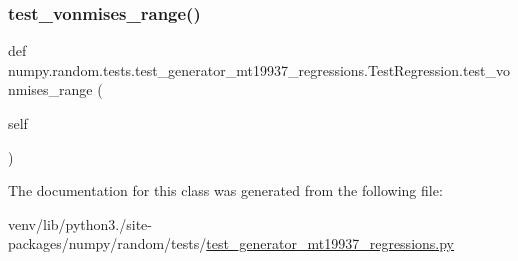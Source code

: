 \subsubsection{\texorpdfstring{test\+\_\+vonmises\+\_\+range()}{test\_vonmises\_range()}}
{\footnotesize\ttfamily def numpy.\+random.\+tests.\+test\+\_\+generator\+\_\+mt19937\+\_\+regressions.\+Test\+Regression.\+test\+\_\+vonmises\+\_\+range (\begin{DoxyParamCaption}\item[{}]{self }\end{DoxyParamCaption})}



The documentation for this class was generated from the following file\+:\begin{DoxyCompactItemize}
\item 
venv/lib/python3./site-\/packages/numpy/random/tests/\hyperlink{test__generator__mt19937__regressions_8py}{test\+\_\+generator\+\_\+mt19937\+\_\+regressions.\+py}\end{DoxyCompactItemize}
